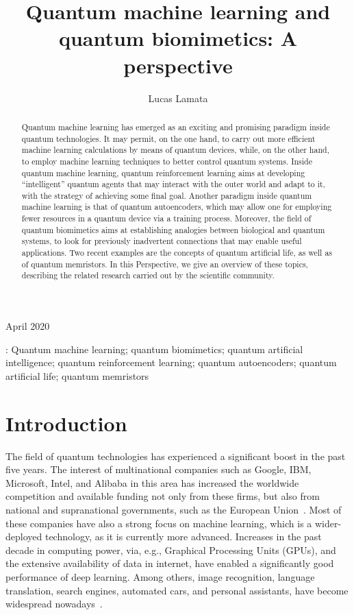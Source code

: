 \documentclass[12pt]{iopart}
\begin{document}
\title{Quantum machine learning and quantum biomimetics: A perspective}

\author{Lucas Lamata}

\address{Departamento de F\'isica At\'omica, Molecular y Nuclear, Universidad de Sevilla, 41080 Sevilla, Spain}
\vspace{10pt}
\begin{indented}
\item[]April 2020
\end{indented}

\begin{abstract}
Quantum machine learning has emerged as an exciting and promising paradigm inside quantum technologies. It may permit, on the one hand, to carry out more efficient machine learning calculations by means of quantum devices, while, on the other hand, to employ machine learning techniques to better control quantum systems. Inside quantum machine learning, quantum reinforcement learning aims at developing ``intelligent'' quantum agents that may interact with the outer world and adapt to it, with the strategy of achieving some final goal. Another paradigm inside quantum machine learning is that of quantum autoencoders, which may allow one for employing fewer resources in a quantum device via a training process. Moreover, the field of quantum biomimetics aims at establishing analogies between biological and quantum systems, to look for previously inadvertent connections that may enable useful applications. Two recent examples are the concepts of quantum artificial life, as well as of quantum memristors. In this Perspective, we give an overview of these topics, describing the related research carried out by the scientific community.
\end{abstract}

\vspace{2pc}
: Quantum machine learning; quantum biomimetics; quantum artificial intelligence; quantum reinforcement learning; quantum autoencoders; quantum artificial life; quantum memristors 



\section{Introduction}

The field of quantum technologies has experienced a significant boost in the past five years. The interest of multinational companies such as Google, IBM, Microsoft, Intel, and Alibaba in this area has increased the worldwide competition and available funding not only from these firms, but also from national and supranational governments, such as the European Union~\cite{Google1,EU}. Most of these companies have also a strong focus on machine learning, which is a wider-deployed technology, as it is currently more advanced. Increases in the past decade in computing power, via, e.g., Graphical Processing Units (GPUs), and the extensive availability of data in internet, have enabled a significantly good performance of deep learning. Among others, image recognition, language translation, search engines, automated cars, and personal assistants, have become widespread nowadays~\cite{HintonNature,RussellAI}. 
\end{document}
